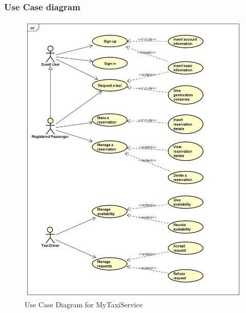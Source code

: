 \subsubsection{Use Case diagram}
\begin{figure}[h!]
	\centering
	\graphicspath{ {../SE2_IMAGES/} }
	\includegraphics[height=0.8\textheight]{UseCaseFinal}
	\caption{Use Case Diagram for MyTaxiService}
\end{figure}
\newpage
